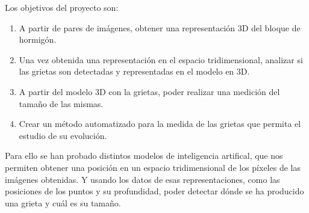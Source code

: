 
Los objetivos del proyecto son:

\begin{enumerate}
	\item A partir de pares de imágenes, obtener una representación 3D del bloque de hormigón.
	\item Una vez obtenida una representación en el espacio tridimensional, analizar si las grietas son detectadas y representadas en el modelo en 3D.
	\item A partir del modelo 3D con la grietas, poder realizar una medición del tamaño de las mismas.
	\item Crear un método automatizado para la medida de las grietas que permita el estudio de su evolución.
\end{enumerate}

Para ello se han probado distintos modelos de inteligencia artifical, que nos permiten obtener una posición en un espacio tridimensional de los píxeles de las imágenes obtenidas. Y usando los datos de esas representaciones, como las posiciones de los puntos y su profundidad, poder detectar dónde se ha producido una grieta y cuál es su tamaño.